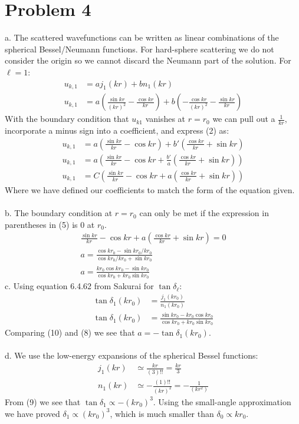 \documentclass[a4paper,11pt]{article}
\numberwithin{equation}{section}
\begin{document}
\section{Problem 4}
a. The scattered wavefunctions can be written as linear combinations of the spherical Bessel/Neumann functions. 
For hard-sphere scattering we do not consider the origin so we cannot discard the Neumann part of the solution.
For $\ell=1$:
\begin{align}
 u_{k,1} &= aj_1(kr)+bn_1(kr)\\
 u_{k,1} &= a\left(\frac{\sin{kr}}{(kr)^2}-\frac{\cos{kr}}{kr} \right) + b\left(-\frac{\cos{kr}}{(kr)^2}-\frac{\sin{kr}}{kr} \right)
\end{align}
With the boundary condition that $u_{k1}$ vanishes at $r=r_0$ we can pull out a $\frac{1}{kr}$, incorporate a minus sign into a coefficient, 
and express (2) as:
\begin{align}
 u_{k,1} &= a\left(\frac{\sin{kr}}{kr}-\cos{kr} \right) + b'\left(\frac{\cos{kr}}{kr}+\sin{kr} \right)\\
 u_{k,1} &= a\left(\frac{\sin{kr}}{kr}-\cos{kr}+\frac{b'}{a}\left(\frac{\cos{kr}}{kr}+\sin{kr} \right)\right) \\
 u_{k,1} &= C\left(\frac{\sin{kr}}{kr}-\cos{kr}+a\left(\frac{\cos{kr}}{kr}+\sin{kr} \right) \right)
\end{align}
Where we have defined our coefficients to match the form of the equation given.\\
\\
b. The boundary condition at $r=r_0$ can only be met if the expression in parentheses in (5) is 0 at $r_0$.
\begin{gather}
 \frac{\sin{kr}}{kr}-\cos{kr}+a\left(\frac{\cos{kr}}{kr}+\sin{kr} \right) = 0\\
 a = \frac{\cos{kr_0}-\sin{kr_0}/kr_0}{\cos{kr_0}/kr_0+\sin{kr_0}}\\
 a = \frac{kr_0\cos{kr_0}-\sin{kr_0}}{\cos{kr_0}+kr_0\sin{kr_0}}
\end{gather}
c. Using equation 6.4.62 from Sakurai for $\tan{\delta_\ell}$:
\begin{align}
 \tan{\delta_1}(kr_0) &= \frac{j_1(kr_0)}{n_1(kr_0)}\\
 \tan{\delta_1}(kr_0) &= \frac{\sin{kr_0}-kr_0\cos{kr_0}}{\cos{kr_0}+kr_0\sin{kr_0}}
\end{align}
Comparing (10) and (8) we see that $a=-\tan{\delta_1}(kr_0)$.
\\ \\
d. We use the low-energy expansions of the spherical Bessel functions:
\begin{align}
 j_1(kr) &\simeq \frac{kr}{(3)!!} = \frac{kr}{3}\\
 n_1(kr) &\simeq -\frac{(1)!!}{(kr)^2} = -\frac{1}{(kr^2)}
\end{align}
From (9) we see that $\tan{\delta_1} \propto -(kr_0)^3$. 
Using the small-angle approximation we have proved $\delta_1 \propto (kr_0)^3$, which is much smaller than $\delta_0 \propto kr_0$.
\end{document}
